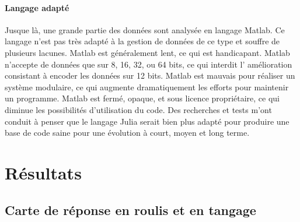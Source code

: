 
\paragraph{Langage adapté}
Jusque là, une grande partie des données sont analysée en langage Matlab. Ce langage n'est pas très adapté à la gestion de données de ce type et souffre de plusieurs lacunes. Matlab est généralement lent, ce qui est handicapant. Matlab n'accepte de données que sur 8, 16, 32, ou 64 bits, ce qui interdit l' amélioration consistant à encoder les données sur 12 bits. Matlab est mauvais pour réaliser un système modulaire, ce qui augmente dramatiquement les efforts pour maintenir un programme. Matlab est fermé, opaque, et sous licence propriétaire, ce qui diminue les possibilités d'utilisation du code.
Des recherches et tests m'ont conduit à penser que le langage Julia serait bien plus adapté pour produire une base de code saine pour une évolution à court, moyen et long terme.



\section{Résultats}


\subsection{Carte de réponse en roulis et en tangage}


